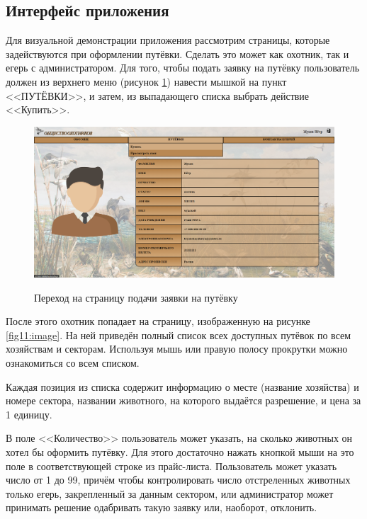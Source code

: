 	\subsection{Интерфейс приложения}
	Для визуальной демонстрации приложения рассмотрим страницы, которые задействуются при оформлении путёвки. Сделать это может как охотник, так и егерь с администратором. 
	Для того, чтобы подать заявку на путёвку пользователь должен из верхнего меню (рисунок \ref{fig10:image}) навести мышкой на пункт <<ПУТЁВКИ>>, и затем, из выпадающего списка выбрать действие <<Купить>>.
	
	\begin{figure}[h]
		\centering
		\begin{center}
			{\includegraphics[scale=0.34]{schemes/screens/start.png}}
			\caption{Переход на страницу подачи заявки на путёвку}
			\label{fig10:image}
		\end{center}
	\end{figure}

	После этого охотник попадает на страницу, изображенную на рисунке \ref{fig11:image}. На ней приведён полный список всех доступных путёвок по всем хозяйствам и секторам. Используя мышь или правую полосу прокрутки можно ознакомиться со всем списком. 
	
	Каждая позиция из списка содержит информацию о месте (название хозяйства) и номере сектора, названии животного, на которого выдаётся разрешение, и цена за 1 единицу. 
	
	В поле <<Количество>> пользователь может указать, на сколько животных он хотел бы оформить путёвку. Для этого достаточно нажать кнопкой мыши на это поле в соответствующей строке из прайс-листа. Пользователь может указать число от 1 до 99, причём чтобы контролировать число отстреленных животных только егерь, закрепленный за данным сектором, или администратор может принимать решение одабривать такую заявку или, наоборот, отклонить. 
	
